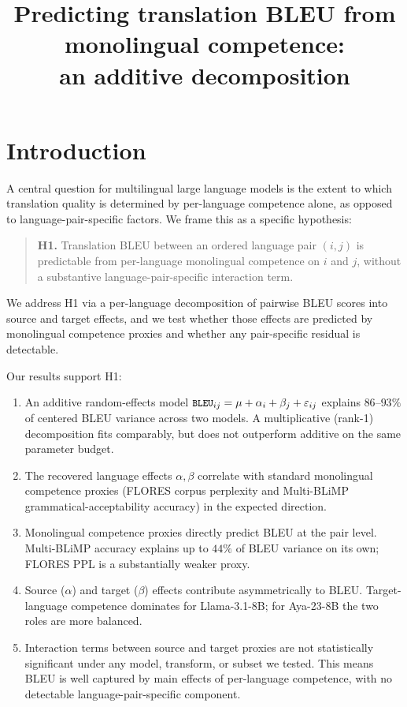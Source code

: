 \documentclass[11pt]{article}
\title{Predicting translation BLEU from monolingual competence: \\
       an additive decomposition}
\author{}
\date{}
\newcommand{\code}[1]{\texttt{\small #1}}
\begin{document}
\maketitle

\section{Introduction}

A central question for multilingual large language models is the extent
to which translation quality is determined by per-language competence
alone, as opposed to language-pair-specific factors. We frame this as a
specific hypothesis:

\begin{quote}
\textbf{H1.} Translation BLEU between an ordered language pair $(i, j)$
is predictable from per-language monolingual competence on $i$ and $j$,
without a substantive language-pair-specific interaction term.
\end{quote}

We address H1 via a per-language decomposition of pairwise BLEU scores
into source and target effects, and we test whether those effects are
predicted by monolingual competence proxies and whether any
pair-specific residual is detectable.

Our results support H1:

\begin{enumerate}
  \item An additive random-effects model
    $\code{BLEU}_{ij} = \mu + \alpha_i + \beta_j + \varepsilon_{ij}$
    explains $86$--$93\%$ of centered BLEU variance across two models.
    A multiplicative (rank-1) decomposition fits comparably, but does not
    outperform additive on the same parameter budget.
  \item The recovered language effects $\alpha, \beta$ correlate with
    standard monolingual competence proxies (FLORES corpus perplexity
    and Multi-BLiMP grammatical-acceptability accuracy) in the expected
    direction.
  \item Monolingual competence proxies directly predict BLEU at the
    pair level. Multi-BLiMP accuracy explains up to $44\%$ of BLEU
    variance on its own; FLORES PPL is a substantially weaker proxy.
  \item Source ($\alpha$) and target ($\beta$) effects contribute
    asymmetrically to BLEU. Target-language competence dominates for
    Llama-3.1-8B; for Aya-23-8B the two roles are more balanced.
  \item Interaction terms between source and target proxies are not
    statistically significant under any model, transform, or subset we
    tested. This means BLEU is well captured by main effects of
    per-language competence, with no detectable language-pair-specific
    component.
\end{enumerate}
\end{document}
